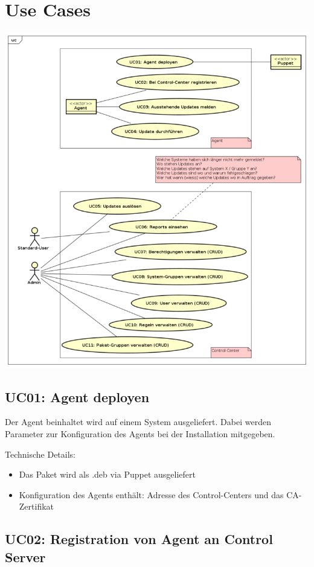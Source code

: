 \section{Use Cases}

\includegraphics[width=\textwidth]{files/UseCases_small}

\xxx[finish]

\subsection{UC01: Agent deployen}

Der Agent beinhaltet wird auf einem System ausgeliefert. Dabei werden Parameter zur Konfiguration des Agents bei der Installation mitgegeben.

Technische Details:

\begin{itemize}
\item Das Paket wird als .deb via Puppet ausgeliefert
\item Konfiguration des Agents enthält: Adresse des Control-Centers und das CA-Zertifikat
\end{itemize}


\subsection{UC02: Registration von Agent an Control Server}

